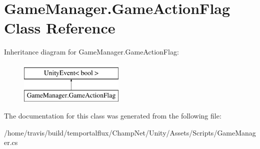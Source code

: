 \hypertarget{class_game_manager_1_1_game_action_flag}{\section{Game\-Manager.\-Game\-Action\-Flag Class Reference}
\label{class_game_manager_1_1_game_action_flag}
}
Inheritance diagram for Game\-Manager.\-Game\-Action\-Flag\-:\begin{figure}[H]
\begin{center}
\leavevmode
\includegraphics[height=2.000000cm]{class_game_manager_1_1_game_action_flag}
\end{center}
\end{figure}


The documentation for this class was generated from the following file\-:\begin{DoxyCompactItemize}
\item 
/home/travis/build/temportalflux/\-Champ\-Net/\-Unity/\-Assets/\-Scripts/Game\-Manager.\-cs\end{DoxyCompactItemize}
